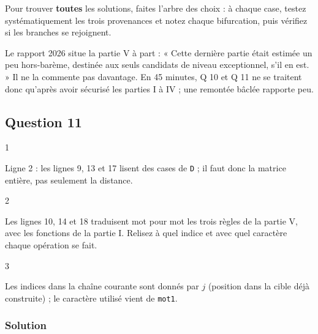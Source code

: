 \documentclass[11pt,a4paper]{article}
\begin{document}
\begin{methode}

Pour trouver \textbf{toutes} les solutions, faites l'arbre des choix : à chaque case, testez systématiquement les trois provenances et notez chaque bifurcation, puis vérifiez si les branches se rejoignent.

\end{methode}

\begin{jury}

Le rapport 2026 situe la partie V à part : « Cette dernière partie était estimée un peu hors-barème, destinée aux seuls candidats de niveau exceptionnel, s'il en est. » Il ne la commente pas davantage. En 45 minutes, Q 10 et Q 11 ne se traitent donc qu'après avoir sécurisé les parties I à IV ; une remontée bâclée rapporte peu.

\end{jury}

\hypertarget{question-11}{%
\subsection{Question 11}\label{question-11}}

\begin{indication}{1}

Ligne 2 : les lignes 9, 13 et 17 lisent des cases de \texttt{D} ; il faut donc la matrice entière, pas seulement la distance.

\end{indication}

\begin{indication}{2}

Les lignes 10, 14 et 18 traduisent mot pour mot les trois règles de la partie V, avec les fonctions de la partie I. Relisez à quel indice et avec quel caractère chaque opération se fait.

\end{indication}

\begin{indication}{3}

Les indices dans la chaîne courante sont donnés par \(j\) (position dans la cible déjà construite) ; le caractère utilisé vient de \texttt{mot1}.

\end{indication}

\hypertarget{solution-13}{%
\subsubsection{Solution}\label{solution-13}}
\end{document}
